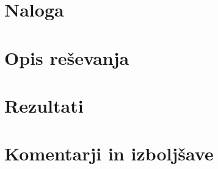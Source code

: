 \documentclass[a4paper]{article}
\begin{document}
\section{Naloga}

\section{Opis reševanja}

\section{Rezultati}


\section{Komentarji in izboljšave}


\newpage


\end{document}
